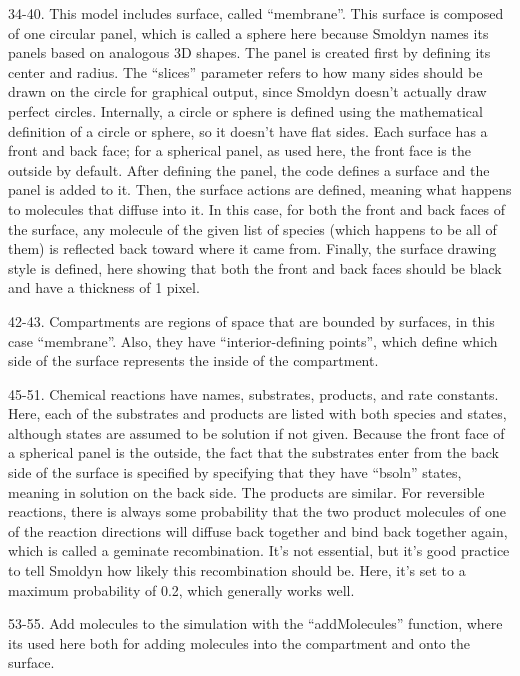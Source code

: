 \documentclass {scrbook}
\begin{document}
\begin{description}
\item{34-40.} This model includes surface, called ``membrane''. This surface is composed of one circular panel, which is called a sphere here because Smoldyn names its panels based on analogous 3D shapes. The panel is created first by defining its center and radius. The ``slices'' parameter refers to how many sides should be drawn on the circle for graphical output, since Smoldyn doesn't actually draw perfect circles. Internally, a circle or sphere is defined using the mathematical definition of a circle or sphere, so it doesn't have flat sides. Each surface has a front and back face; for a spherical panel, as used here, the front face is the outside by default. After defining the panel, the code defines a surface and the panel is added to it. Then, the surface actions are defined, meaning what happens to molecules that diffuse into it. In this case, for both the front and back faces of the surface, any molecule of the given list of species (which happens to be all of them) is reflected back toward where it came from. Finally, the surface drawing style is defined, here showing that both the front and back faces should be black and have a thickness of 1 pixel.

\item{42-43.} Compartments are regions of space that are bounded by surfaces, in this case ``membrane''. Also, they have ``interior-defining points'', which define which side of the surface represents the inside of the compartment.

\item{45-51.} Chemical reactions have names, substrates, products, and rate constants. Here, each of the substrates and products are listed with both species and states, although states are assumed to be solution if not given. Because the front face of a spherical panel is the outside, the fact that the substrates enter from the back side of the surface is specified by specifying that they have ``bsoln'' states, meaning in solution on the back side. The products are similar. For reversible reactions, there is always some probability that the two product molecules of one of the reaction directions will diffuse back together and bind back together again, which is called a geminate recombination. It's not essential, but it's good practice to tell Smoldyn how likely this recombination should be. Here, it's set to a maximum probability of 0.2, which generally works well.

\item{53-55.} Add molecules to the simulation with the ``addMolecules'' function, where its used here both for adding molecules into the compartment and onto the surface.


\end{description}
\end{document}
